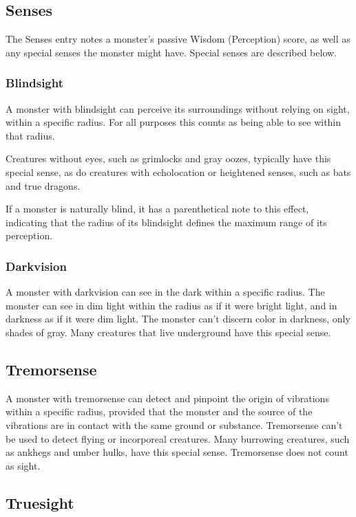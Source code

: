 \subsection{Senses}

The Senses entry notes a monster's passive Wisdom (Perception) score, as well as any special senses the monster might have. Special senses are described below.

\subsubsection{Blindsight}

A monster with blindsight can perceive its surroundings without relying on sight, within a specific radius. For all purposes this counts as being able to see within that radius.

Creatures without eyes, such as grimlocks and gray oozes, typically have this special sense, as do creatures with echolocation or heightened senses, such as bats and true dragons.

If a monster is naturally blind, it has a parenthetical note to this effect, indicating that the radius of its blindsight defines the maximum range of its perception.

\subsubsection{Darkvision}

A monster with darkvision can see in the dark within a specific radius. The monster can see in dim light within the radius as if it were bright light, and in darkness as if it were dim light. The monster can't discern color in darkness, only shades of gray. Many creatures that live underground have this special sense.

\subsection{Tremorsense}

A monster with tremorsense can detect and pinpoint the origin of vibrations within a specific radius, provided that the monster and the source of the vibrations are in contact with the same ground or substance. Tremorsense can't be used to detect flying or incorporeal creatures. Many burrowing creatures, such as ankhegs and umber hulks, have this special sense. Tremorsense does not count as sight.

\subsection{Truesight}

